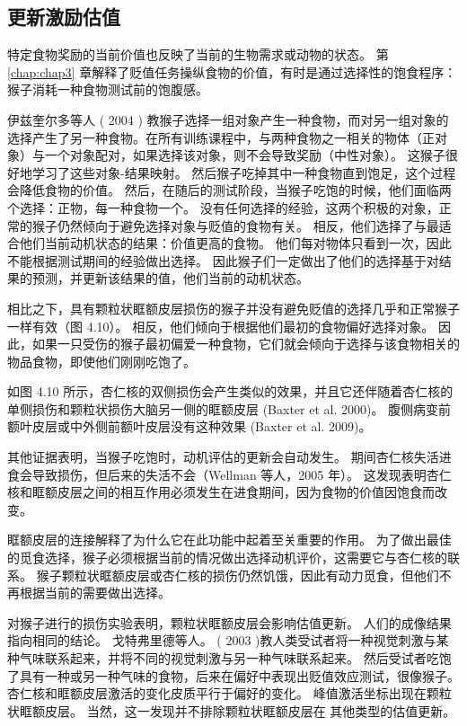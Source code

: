 \subsection{更新激励估值}

特定食物奖励的当前价值也反映了当前的生物需求或动物的状态。
第 \ref{chap:chap3} 章解释了贬值任务操纵食物的价值，有时是通过选择性的饱食程序：猴子消耗一种食物测试前的饱腹感。\par


伊兹奎尔多等人 ( 2004 ) 教猴子选择一组对象产生一种食物，而对另一组对象的选择产生了另一种食物。在所有训练课程中，与两种食物之一相关的物体（正对象）与一个对象配对，如果选择该对象，则不会导致奖励（中性对象）。
这猴子很好地学习了这些对象-结果映射。
然后猴子吃掉其中一种食物直到饱足，这个过程会降低食物的价值。
然后，在随后的测试阶段，当猴子吃饱的时候，他们面临两个选择：正物，每一种食物一个。
没有任何选择的经验，这两个积极的对象，正常的猴子仍然倾向于避免选择对象与贬值的食物有关。
相反，他们选择了与最适合他们当前动机状态的结果：价值更高的食物。
他们每对物体只看到一次，因此不能根据测试期间的经验做出选择。
因此猴子们一定做出了他们的选择基于对结果的预测，并更新该结果的值，他们当前的动机状态。\par


相比之下，具有颗粒状眶额皮层损伤的猴子并没有避免贬值的选择几乎和正常猴子一样有效（图 4.10）。
相反，他们倾向于根据他们最初的食物偏好选择对象。 因此，如果一只受伤的猴子最初偏爱一种食物，它们就会倾向于选择与该食物相关的物品食物，即使他们刚刚吃饱了。\par


如图 4.10 所示，杏仁核的双侧损伤会产生类似的效果，并且它还伴随着杏仁核的单侧损伤和颗粒状损伤大脑另一侧的眶额皮层 (Baxter et al. 2000)。
腹侧病变前额叶皮层或中外侧前额叶皮层没有这种效果 (Baxter et al. 2009)。\par


其他证据表明，当猴子吃饱时，动机评估的更新会自动发生。
期间杏仁核失活进食会导致损伤，但后来的失活不会（Wellman 等人，2005 年）。
这发现表明杏仁核和眶额皮层之间的相互作用必须发生在进食期间，因为食物的价值因饱食而改变。\par


眶额皮层的连接解释了为什么它在此功能中起着至关重要的作用。
为了做出最佳的觅食选择，猴子必须根据当前的情况做出选择动机评价，这需要它与杏仁核的联系。
猴子颗粒状眶额皮层或杏仁核的损伤仍然饥饿，因此有动力觅食，但他们不再根据当前的需要做出选择。\par


对猴子进行的损伤实验表明，颗粒状眶额皮层会影响估值更新。
人们的成像结果指向相同的结论。
戈特弗里德等人。 ( 2003 )教人类受试者将一种视觉刺激与某种气味联系起来，并将不同的视觉刺激与另一种气味联系起来。
然后受试者吃饱了具有一种或另一种气味的食物，后来在偏好中表现出贬值效应测试，很像猴子。
杏仁核和眶额皮层激活的变化皮质平行于偏好的变化。
峰值激活坐标出现在颗粒状眶额皮层。
当然，这一发现并不排除颗粒状眶额皮层在
其他类型的估值更新。\par


